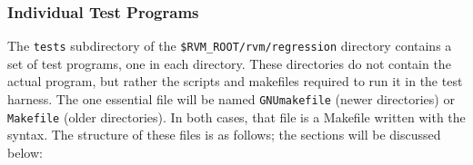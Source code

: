 \subsubsection{Individual Test Programs}

 The {\tt tests} subdirectory of the {\tt{\$RVM\_\-ROOT/rvm/regression}}
directory contains a set of test programs, one in each directory.
These directories do not contain the actual program, but rather the
scripts and makefiles required to run it in the test harness.  The one
essential file will be named \texttt{GNUmakefile} (newer directories)
or \texttt{Makefile} (older directories).  In both cases, that file is
a Makefile written with the  syntax.  The structure of these
files is as follows; the sections will be discussed below:  
\begin{enumerate}
\end{enumerate}

